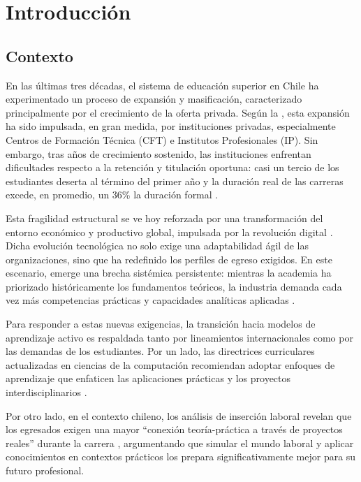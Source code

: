 \chapter{Introducci\'on}
\label{cap:intro}

\section{Contexto}
\label{intro:contexto}
En las últimas tres décadas, el sistema de educación superior en Chile ha experimentado un proceso de expansión y masificación, caracterizado principalmente por el crecimiento de la oferta privada. Según la \textcite{subsecretaria_de_educacion_superior_evidencias_2025},  esta expansión ha sido impulsada, en gran medida, por instituciones privadas, especialmente Centros de Formación Técnica (CFT) e Institutos Profesionales (IP). Sin embargo, tras años de crecimiento sostenido,
las instituciones enfrentan dificultades respecto a la retención y titulación oportuna: casi un tercio de los estudiantes deserta al término del primer año y la duración real de las carreras excede, en promedio, un 36\% la duración formal \parencite{subsecretaria_de_educacion_superior_evidencias_2025}.


Esta fragilidad estructural se ve hoy reforzada por una transformación del entorno económico y productivo global, impulsada por la revolución digital \parencite{araujo_chile_2023}. Dicha evolución tecnológica no solo exige una adaptabilidad
ágil de las organizaciones, sino que ha redefinido los perfiles de egreso
exigidos. En este escenario, emerge una brecha sistémica persistente: mientras la academia ha priorizado históricamente los fundamentos teóricos, la industria demanda cada vez más competencias prácticas y capacidades analíticas aplicadas \parencite{constantinov_preliminary_2015,miedema_data_2025}.

Para responder a estas nuevas exigencias, la transición hacia modelos de aprendizaje activo es respaldada tanto por lineamientos internacionales como por las demandas de los estudiantes. Por un lado, las directrices curriculares actualizadas en ciencias de la computación recomiendan adoptar enfoques de aprendizaje que enfaticen las aplicaciones prácticas y los proyectos interdisciplinarios \parencite{miedema_data_2025}.

Por otro lado, en el contexto chileno, los análisis de inserción laboral revelan que los egresados exigen una mayor \enquote{conexión teoría-práctica a través de proyectos reales} \parencite[p.~62]{latuz2024} durante
la carrera , argumentando que simular el mundo laboral y aplicar conocimientos en contextos prácticos los prepara significativamente mejor para su futuro
profesional.


